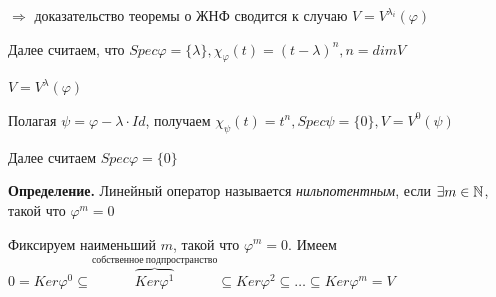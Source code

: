 $\Rightarrow$ доказательство теоремы о ЖНФ сводится к случаю $V = V^{\lambda_i} (\varphi)$

Далее считаем, что $Spec \varphi = \{ \lambda\}, \chi_{\varphi} (t) = (t - \lambda)^n, n = dim V$

$V = V^{\lambda} (\varphi)$

Полагая $\psi = \varphi - \lambda \cdot Id$, получаем $\chi_{\psi} (t) = t^n, Spec \psi = \{0\}, V = V^0 (\psi)$

Далее считаем $Spec \varphi = \{0\}$

\bigskip
\textbf{Определение.} Линейный оператор называется \textit{нильпотентным}, если $\exists m \in \mathbb{N}$, такой что $\varphi^m = 0$

\bigskip
Фиксируем наименьший $m$, такой что $\varphi^m = 0$. Имеем $0 = Ker \varphi^0 \subseteq \overbrace{Ker \varphi^1}^{собственное \ подпространство} \subseteq Ker \varphi^2 \subseteq \dots \subseteq Ker \varphi^m = V$

